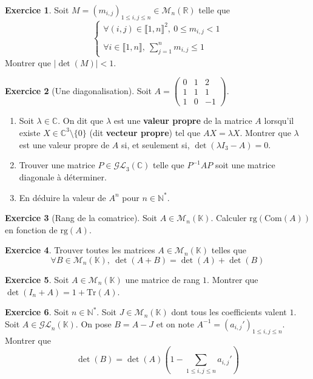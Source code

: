 \documentclass[french]{book}
\newcommand{\N}{\mathbb{N}}
\newcommand{\R}{\mathbb{R}}
\newcommand{\C}{\mathbb{C}}
\newcommand{\K}{\mathbb{K}}
\newcommand{\st}{^*}
\newcommand{\inv}{^{-1}}
\newcommand{\Tr}{\text{Tr}}
\theoremstyle{definition}
\newtheorem{ex}{Exercice}[chapter]
\theoremstyle{theorem}
\theoremstyle{remark}
\begin{document}
\begin{ex}
	Soit $M=(m_{i,j})_{1\leqslant i,j\leqslant n}\in\mathcal{M}_n(\R)$ telle que $$\begin{cases}
		\forall (i,j)\in\llbracket1,n\rrbracket^2,\ 0\leqslant m_{i,j}<1 \\
		\\
		\forall i\in\llbracket1,n\rrbracket,\ \displaystyle\sum_{j=1}^{n}m_{i,j}\leqslant 1
	\end{cases}$$ Montrer que $\lvert\det(M)\rvert<1$.
\end{ex}

\begin{ex}[Une diagonalisation]
	Soit $A=\displaystyle\begin{pmatrix}
		0&1&2\\
		1&1&1\\
		1&0&-1
	\end{pmatrix}$.
	\begin{enumerate}
		\item Soit $\lambda\in\C$. On dit que $\lambda$ est une \textbf{valeur propre} de la matrice $A$ lorsqu'il existe $X\in\C^3\setminus\{0\}$ (dit \textbf{vecteur propre}) tel que $AX=\lambda X$. Montrer que $\lambda$ est une valeur propre de $A$ si, et seulement si, $\det(\lambda I_3-A)=0$.
		\item Trouver une matrice $P\in\mathcal{GL}_3(\C)$ telle que $P\inv AP$ soit une matrice diagonale à déterminer.
		\item En déduire la valeur de $A^n$ pour $n\in\N\st$.
	\end{enumerate}
\end{ex}

\begin{ex}[Rang de la comatrice]
	Soit $A\in\mathcal{M}_n(\K)$. Calculer $\text{rg}(\text{Com}(A))$ en fonction de $\text{rg}(A)$.
\end{ex}

\begin{ex}
	Trouver toutes les matrices $A\in\mathcal{M}_n(\K)$ telles que $$\forall B\in\mathcal{M}_n(\K),\ \det(A+B)=\det(A)+\det(B)$$
\end{ex}

\begin{ex}
	Soit $A\in\mathcal{M}_n(\K)$ une matrice de rang $1$. Montrer que $\det(I_n+A)=1+\Tr(A)$.
\end{ex}

\begin{ex}
	Soit $n\in\N\st$. Soit $J\in\mathcal{M}_n(\K)$ dont tous les coefficients valent $1$. Soit $A\in\mathcal{GL}_n(\K)$. On pose $B=A-J$ et on note $A\inv=(a_{i,j}')_{1\leqslant i,j\leqslant n}$. Montrer que $$\det(B)=\det(A)\left(1-\sum_{1\leqslant i,j\leqslant n}a_{i,j}'\right)$$
\end{ex}
\end{document}

